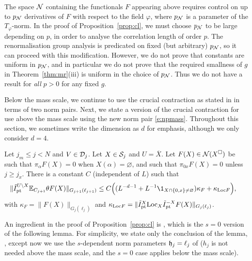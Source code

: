 The space $\mathcal{N}$ containing the functionals $F$ appearing above requires control on
up to $p_{\mathcal{N}}$ derivatives of $F$ with respect to the field $\varphi$,
where $p_{\mathcal{N}}$ is a parameter of the $T_\varphi$-norm.
In the proof of Proposition~\ref{prop:cl}, we must choose $p_{\mathcal{N}}$ to be large
depending on $p$, in order to analyse the correlation length
of order $p$.  The renormalisation group analysis is predicated on fixed (but arbitrary)
$p_{\mathcal{N}}$, so it can proceed with this modification.  However,
we do not prove that constants are uniform in $p_{\mathcal{N}}$,
and in particular we do not prove that the required smallness of $g$ in
Theorem~\ref{thm:mr}(iii) is uniform in the choice of $p_{\mathcal{N}}$.
Thus we do not have a result for \emph{all} $p>0$ for any fixed $g$.

Below the mass scale, we continue to use the crucial contraction as stated in
\cite[Proposition \ref{IE-prop:cl}]{BS-rg-IE} in terms of two norm pairs.
Next, we state a version of the crucial contraction for use above the mass
scale using the new norm pair \eqref{e:npmass}.
Throughout this section, we
sometimes write the dimension as $d$ for emphasis, although we only consider $d=4$.


\begin{prop}
\label{prop:cl} Let $j_m \leq j<N$ and $V\in \mathcal{D}_j$.  Let $X \in \mathcal{S}_j$ and
$U = \overline X$.  Let $F(X) \in \mathcal{N}(X^\Box)$ be such that
$\pi_\alpha F(X) =0$ when $X(\alpha)=\varnothing$, and such that
$\pi_{0x}F(X)=0$ unless $j \ge j_x$.
{There is a constant $C$ (independent of $L$) such that}
\begin{align}
    \label{e:contraction3z-new}
    \|\Ipttil^{U\setminus X} \Ex_{C_{j+1}} \theta F (X) \|_{{G_{j+1}(\ell_{j+1})}}
    &
    \leq C \Big(
    ( L^{-d -1} +  L^{-1}\1_{X \cap \{0,x\} \not = \varnothing} )
    \kappa_F
    + \kappa_{\LT F}
    \Big)
    ,
\end{align}
with $\kappa_F=\|F (X)\|_{{G_{j}(\ell_{j})}}$ and
$\kappa_{{\rm Loc} F} =\|\tilde{I}_{\rm pt}^X {\rm Loc}_X \tilde{I}_{\rm pt}^{-X} F(X) \|_{{G_{j}(\ell_{j})}}$.
\end{prop}

An ingredient in the proof of Proposition~\ref{prop:cl} is
\cite[Lemma~\ref{loc-lem:phij}]{BS-rg-loc}, which is the $s=0$ version of
the following lemma.  For simplicity, we state only the conclusion of the lemma,
\cite[Lemma~\ref{loc-lem:phij}]{BS-rg-loc}, except now we use the
$s$-dependent norm parameters
$\mathfrak{h}_j=\ell_j$ of  ($h_j$ is not needed above the mass scale, and
the $s=0$ case applies below the mass scale).

